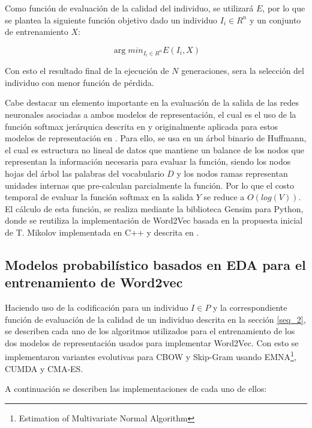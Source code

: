 Como función de evaluación de la calidad del individuo, se utilizará $E$, por lo que se plantea la siguiente función objetivo dado un individuo $I_{i} \in R^{n}$ y un conjunto de entrenamiento $X$:

\[\arg min_{I_{i}\in R^{n}}E(I_{i},X)\]

Con esto el resultado final de la ejecución de $N$ generaciones, sera la selección del individuo con menor función de pérdida. 

Cabe destacar un elemento importante en la evaluación de la salida de las redes neuronales asociadas a ambos modelos de representación, el cual es el uso de la función softmax jerárquica descrita en \cite{Rong2016} y originalmente aplicada para estos modelos de representación en \cite{Mikolov2013a}. Para ello, se usa en un árbol binario de Huffmann, el cual es estructura no lineal de datos que mantiene un balance de los nodos que representan la información necesaria para evaluar la función, siendo los nodos hojas del árbol las palabras del vocabulario $D$ y los nodos ramas representan unidades internas que pre-calculan parcialmente la función. Por lo que el costo temporal de evaluar la función softmax en la salida $Y$ se reduce a $O(log(V))$. El cálculo de esta función, se realiza mediante la biblioteca Gensim para Python\cite{Landthaler2017}, donde se reutiliza la implementación de Word2Vec basada en la propuesta inicial de T. Mikolov implementada en C++ y descrita en \cite{Mikolov2013,Mikolov2013a}.

\subsection{Modelos probabilístico basados en EDA para el entrenamiento de Word2vec}\label{seq_3}

Haciendo uso de la codificación para un individuo $I \in P$ y la correspondiente función de evaluación de la calidad de un individuo descrita en la sección \ref{seq_2}, se describen cada uno de los algoritmos utilizados para el entrenamiento de los dos modelos de representación usados para implementar Word2Vec. Con esto se implementaron variantes evolutivas para CBOW y Skip-Gram usando EMNA\footnote{Estimation of Multivariate Normal Algorithm}, CUMDA y CMA-ES.

A continuación se describen las implementaciones de cada uno de ellos:

